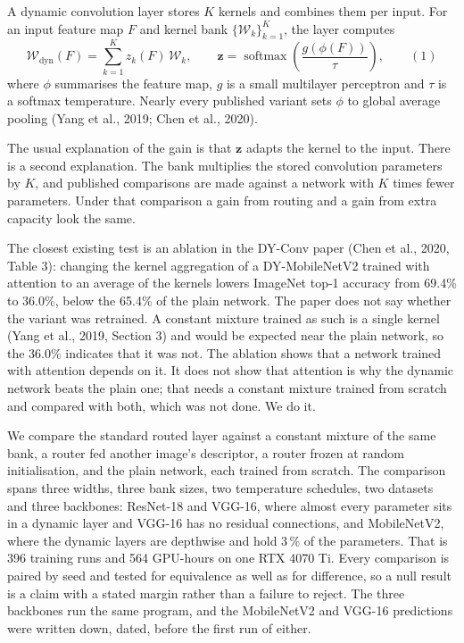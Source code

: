 \documentclass{article}
\begin{document}
A dynamic convolution layer stores $K$ kernels and combines them per
input. For an input feature map $F$ and kernel bank
$\{\mathcal{W}_k\}_{k=1}^{K}$, the layer computes
$$\mathcal{W}_{\text{dyn}}(F)=\sum_{k=1}^{K} z_k(F)\,\mathcal{W}_k,
\qquad
\mathbf{z}=\operatorname{softmax}\!\left(\frac{g(\phi(F))}{\tau}\right),\qquad(1)$$
where $\phi$ summarises the feature map, $g$ is a small multilayer
perceptron and $\tau$ is a softmax temperature. Nearly every published
variant sets $\phi$ to global average pooling
(Yang et al., 2019; Chen et al., 2020).

The usual explanation of the gain is that $\mathbf{z}$ adapts the kernel to the
input. There is a second explanation. The bank multiplies the stored
convolution parameters by $K$, and published comparisons are made against
a network with $K$ times fewer parameters. Under that comparison a gain
from routing and a gain from extra capacity look the same.

The closest existing test is an ablation in the DY-Conv paper
(Chen et al., 2020, Table 3): changing the kernel aggregation of a
DY-MobileNetV2 trained with attention to an average of the kernels lowers
ImageNet top-1 accuracy from 69.4\% to 36.0\%,
below the 65.4\% of the plain network. The paper does not say
whether the variant was retrained. A constant mixture trained as such is a
single kernel (Yang et al., 2019, Section 3) and would be expected
near the plain network, so the 36.0\% indicates that it was
not. The ablation shows that a network trained with attention depends on
it. It does not show that attention is why the dynamic network beats the
plain one; that needs a constant mixture trained from scratch and compared
with both, which was not done. We do it.

We compare the standard routed layer against a constant mixture of the
same bank, a router fed another image's descriptor, a router frozen at
random initialisation, and the plain network, each trained from scratch.
The comparison spans three widths, three bank sizes, two temperature
schedules, two datasets and three backbones: ResNet-18 and VGG-16, where
almost every parameter sits in a dynamic layer and VGG-16 has no residual
connections, and MobileNetV2, where the dynamic layers are depthwise and
hold 3\,\% of the parameters. That is 396 training
runs and 564 GPU-hours on one RTX 4070 Ti. Every comparison is
paired by seed and tested for equivalence as well as for difference, so a
null result is a claim with a stated margin rather than a failure to
reject. The three backbones run the same program, and the MobileNetV2 and
VGG-16 predictions were written down, dated, before the first run of
either.
\end{document}
